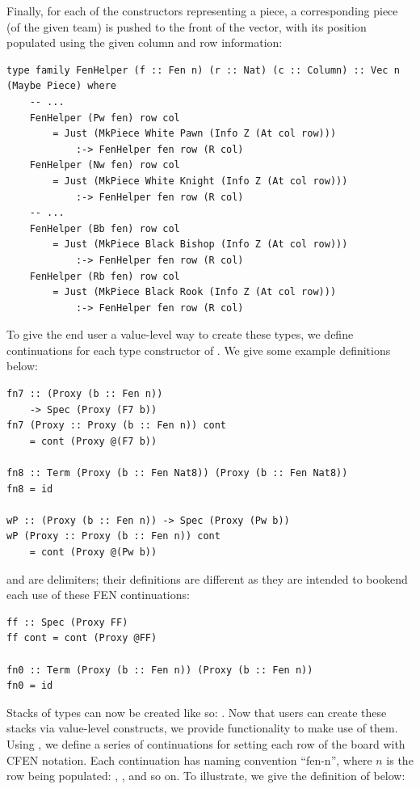 Finally, for each of the constructors representing a piece, a corresponding piece (of the given team) is pushed to the front of the vector, with its position populated using the given column and row information:

\begin{lstlisting}
type family FenHelper (f :: Fen n) (r :: Nat) (c :: Column) :: Vec n (Maybe Piece) where
    -- ...
    FenHelper (Pw fen) row col
        = Just (MkPiece White Pawn (Info Z (At col row)))
            :-> FenHelper fen row (R col)
    FenHelper (Nw fen) row col
        = Just (MkPiece White Knight (Info Z (At col row)))
            :-> FenHelper fen row (R col)
    -- ...
    FenHelper (Bb fen) row col
        = Just (MkPiece Black Bishop (Info Z (At col row)))
            :-> FenHelper fen row (R col)
    FenHelper (Rb fen) row col
        = Just (MkPiece Black Rook (Info Z (At col row)))
            :-> FenHelper fen row (R col)
\end{lstlisting}

To give the end user a value-level way to create these  types, we define continuations for each type constructor of . We give some example definitions below:

\begin{lstlisting}
fn7 :: (Proxy (b :: Fen n))
    -> Spec (Proxy (F7 b))
fn7 (Proxy :: Proxy (b :: Fen n)) cont
    = cont (Proxy @(F7 b))

fn8 :: Term (Proxy (b :: Fen Nat8)) (Proxy (b :: Fen Nat8))
fn8 = id

wP :: (Proxy (b :: Fen n)) -> Spec (Proxy (Pw b))
wP (Proxy :: Proxy (b :: Fen n)) cont
    = cont (Proxy @(Pw b))
\end{lstlisting}

 and  are delimiters; their definitions are different as they are intended to bookend each use of these FEN continuations:

\begin{lstlisting}
ff :: Spec (Proxy FF)
ff cont = cont (Proxy @FF)

fn0 :: Term (Proxy (b :: Fen n)) (Proxy (b :: Fen n))
fn0 = id
\end{lstlisting}

Stacks of  types can now be created like so: . Now that users can create these stacks via value-level constructs, we provide functionality to make use of them. Using , we define a series of continuations for setting each row of the board with CFEN notation. Each continuation has naming convention ``fen-n'', where $n$ is the row being populated: , , and so on. To illustrate, we give the definition of  below:

